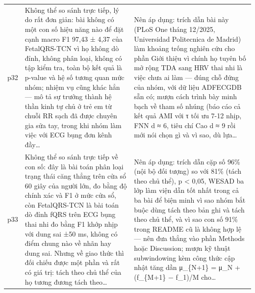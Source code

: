 \begin{longtable}{@{}L{1.05cm} L{6.0cm} L{7.2cm}@{}}
p32 & {\scriptsize Không thể so sánh trực tiếp, lý do rất đơn giản: bài không có một con số hiệu năng nào để đặt cạnh macro F1 97,43 ± 4,37 của FetalQRS-TCN vì họ không dò đỉnh, không phân loại, không có tập kiểm tra, toàn bộ kết quả là p-value và hệ số tương quan mức nhóm; nhiệm vụ cũng khác hẳn — mô tả sự trưởng thành hệ thần kinh tự chủ ở trẻ em từ chuỗi RR sạch đã được chuyên gia sửa tay, trong khi nhóm làm việc với ECG bụng đơn kênh đầy…} & {\scriptsize Nên áp dụng: trích dẫn bài này (PLoS One tháng 12/2025, Universidad Politecnica de Madrid) làm khoảng trống nghiên cứu cho phần Giới thiệu vì chính họ tuyên bố mở rộng TDA sang HRV thai nhi là việc chưa ai làm — đúng chỗ đứng của nhóm, với dữ liệu ADFECGDB sẵn có; mượn cách trình bày minh bạch về tham số nhúng (báo cáo cả kết quả AMI với τ tối ưu 7-12 nhịp, FNN d ≈ 6, tiêu chí Cao d ≈ 9 rồi mới nói chọn gì và vì sao, dù lựa…} \\[2pt]
p33 & {\scriptsize Không thể so sánh trực tiếp về con số: đây là bài toán phân loại trạng thái căng thẳng trên cửa sổ 60 giây của người lớn, đo bằng độ chính xác và F1 ở mức cửa sổ, còn FetalQRS-TCN là bài toán dò đỉnh fQRS trên ECG bụng thai nhi đo bằng F1 khớp nhịp với dung sai ±50 ms, không có điểm chung nào về nhãn hay dung sai. Nhưng về giao thức thì đối chiếu được một phần và rất có giá trị: tách theo chủ thể của họ tương đương tách theo…} & {\scriptsize Nên áp dụng: trích dẫn cặp số 96\% (nội bộ đối tượng) so với 81\% (tách theo chủ thể), p < 0,05, WESAD ba lớp làm viện dẫn tốt nhất trong cả ba bài để biện minh vì sao nhóm bắt buộc dùng tách theo bản ghi và tách theo chủ thể, và vì sao con số 91\% trong README cũ là không hợp lệ — nên đưa thẳng vào phần Methods hoặc Discussion; mượn kỹ thuật subwindowing kèm công thức cập nhật tăng dần μ\_\{N+1\} = μ\_N + (f\_\{M+1\} − f\_1)/M cho…} \\[2pt]
\end{longtable}
